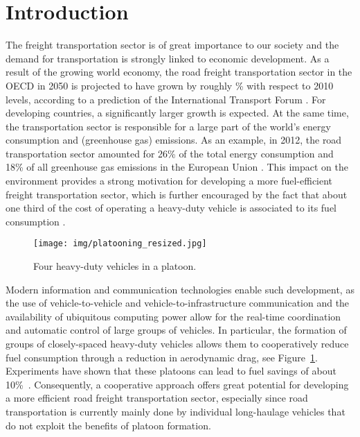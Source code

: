 \documentclass[journal]{IEEEtran}
\begin{document}
\section{Introduction}\label{sec_introduction}
The freight transportation sector is of great importance to our society and the demand for transportation is strongly linked to economic development. As a result of the growing world economy, the road freight transportation sector in the OECD in 2050 is projected to have grown by roughly \% with respect to 2010 levels, according to a prediction of the International Transport Forum \cite{itf_transportoutlook_2015}. For developing countries, a significantly larger growth is expected. At the same time, the transportation sector is responsible for a large part of the world's energy consumption and (greenhouse gas) emissions. As an example, in 2012, the road transportation sector amounted for 26\% of the total energy consumption and 18\% of all greenhouse gas emissions in the European Union \cite{eu_pocketbook_2014}. This impact on the environment provides a strong motivation for developing a more fuel-efficient freight transportation sector, which is further encouraged by the fact that about one third of the cost of operating a heavy-duty vehicle is associated to its fuel consumption \cite{scania_annualreport_2014}.

\begin{figure}
\begin{center}
  \texttt{[image: img/platooning\_resized.jpg]}
  \vskip-1mm\caption{Four heavy-duty vehicles in a platoon.}
  \label{fig_platoonphoto}
\end{center}
\end{figure}

Modern information and communication technologies enable such development, as the use of vehicle-to-vehicle and vehicle-to-infrastructure communication and the availability of ubiquitous computing power allow for the real-time coordination and automatic control of large groups of vehicles. In particular, the
formation of groups of closely-spaced heavy-duty vehicles allows them to cooperatively reduce fuel consumption through a reduction in aerodynamic drag, see Figure~\ref{fig_platoonphoto}. Experiments have shown that these platoons can lead to fuel savings of about 10\%~\cite{bonnet_2000,alam_2010}. Consequently, a cooperative approach offers great potential for developing a more efficient road freight transportation sector, especially since road transportation is currently mainly done by individual long-haulage vehicles that do not exploit the benefits of platoon formation.
\end{document}
